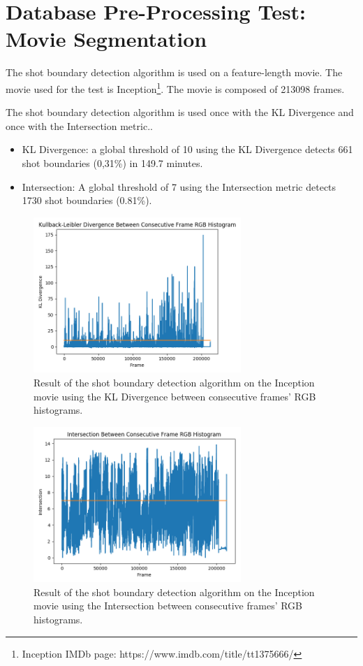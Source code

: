 \section{Database Pre-Processing Test: Movie Segmentation}

The shot boundary detection algorithm is used on a feature-length movie. The movie used for the test is Inception\footnote{Inception IMDb page: https://www.imdb.com/title/tt1375666/}. The movie is composed of 213098 frames.

The shot boundary detection algorithm is used once with the KL Divergence and once with the Intersection metric..

\begin{itemize}
    \item KL Divergence: a global threshold of 10 using the KL Divergence detects 661 shot boundaries (0,31\%) in 149.7 minutes.
    \item Intersection: A global threshold of 7 using the Intersection metric detects 1730 shot boundaries (0.81\%).
\end{itemize}

\begin{figure}[h] 
\centerline{\includegraphics[width=0.70\textwidth]{figures/evaluation/inception_KLdiv_threshold10.png}}
\caption{\label{fig:inception_KLdiv_threshold10}Result of the shot boundary detection algorithm on the Inception movie using the KL Divergence between consecutive frames' RGB histograms.}
\end{figure}

\begin{figure}[h] 
\centerline{\includegraphics[width=0.70\textwidth]{figures/evaluation/inception_inter_threshold7.png}}
\caption{\label{fig:inception_inter_threshold7}Result of the shot boundary detection algorithm on the Inception movie using the Intersection between consecutive frames' RGB histograms.}
\end{figure}

